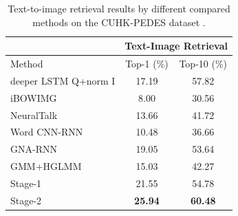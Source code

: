 \begin{table}[]
	\small
	\centering
	\begin{tabular}{|l|c|c|}
		\hline
		& \multicolumn{2}{c|}{Text-Image Retrieval}                                     \\ \hline
		Method                                          & Top-1 (\%)                              & Top-10 (\%)                       \\ \hline
		deeper LSTM Q+norm I \cite{Antol_2015_ICCV}     & 17.19                                   & 57.82                                 \\ \hline
		iBOWIMG \cite{zhou2015simple}                   & 8.00                                    & 30.56                                 \\ \hline
		NeuralTalk \cite{vinyals2015show}               & 13.66                                   & 41.72                                 \\ \hline
		Word CNN-RNN \cite{reed2016learning}            & 10.48                                   & 36.66                                 \\ \hline
		GNA-RNN \cite{li2017person}                     & 19.05                                   & 53.64                                 \\ \hline
		GMM+HGLMM \cite{klein2015associating}                     & 15.03                                   & 42.27                                 \\ \hline
		\hline
		Stage-1                                        & 21.55                                   & 54.78                                 \\ \hline
		Stage-2                                      & {\textbf{25.94}}                                   & {\textbf{60.48}}                                 \\ \hline
	\end{tabular}
	\caption{Text-to-image retrieval results by different compared methods on the CUHK-­PEDES dataset \cite{li2017person}.}
	\label{tab:reid_dataset}
\end{table}
